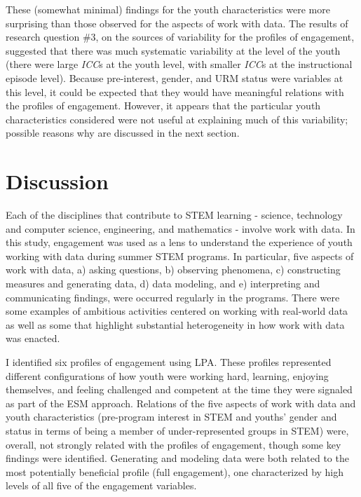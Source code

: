 \documentclass[]{book}
\theoremstyle{definition}
\theoremstyle{definition}
\theoremstyle{definition}
\theoremstyle{remark}
\begin{document}
These (somewhat minimal) findings for the youth characteristics were
more surprising than those observed for the aspects of work with data.
The results of research question \#3, on the sources of variability for
the profiles of engagement, suggested that there was much systematic
variability at the level of the youth (there were large \emph{ICC}s at
the youth level, with smaller \emph{ICC}s at the instructional episode
level). Because pre-interest, gender, and URM status were variables at
this level, it could be expected that they would have meaningful
relations with the profiles of engagement. However, it appears that the
particular youth characteristics considered were not useful at
explaining much of this variability; possible reasons why are discussed
in the next section.

\chapter{Discussion}\label{discussion}

Each of the disciplines that contribute to STEM learning - science,
technology and computer science, engineering, and mathematics - involve
work with data. In this study, engagement was used as a lens to
understand the experience of youth working with data during summer STEM
programs. In particular, five aspects of work with data, a) asking
questions, b) observing phenomena, c) constructing measures and
generating data, d) data modeling, and e) interpreting and communicating
findings, were occurred regularly in the programs. There were some
examples of ambitious activities centered on working with real-world
data as well as some that highlight substantial heterogeneity in how
work with data was enacted.

I identified six profiles of engagement using LPA. These profiles
represented different configurations of how youth were working hard,
learning, enjoying themselves, and feeling challenged and competent at
the time they were signaled as part of the ESM approach. Relations of
the five aspects of work with data and youth characteristics
(pre-program interest in STEM and youths' gender and status in terms of
being a member of under-represented groups in STEM) were, overall, not
strongly related with the profiles of engagement, though some key
findings were identified. Generating and modeling data were both related
to the most potentially beneficial profile (full engagement), one
characterized by high levels of all five of the engagement variables.
\end{document}
